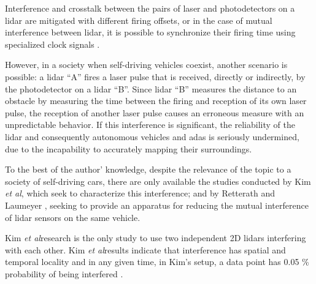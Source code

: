 \documentclass[extendedabs]{recpad2k}
\def\etal{\emph{et al}\bmvaOneDot}
\begin{document}
Interference and crosstalk between the pairs of laser and photodetectors on a \gls{lidar} are mitigated with different firing offsets, or in the case of mutual interference between \gls{lidar}, it is possible to synchronize their firing time using specialized clock signals \cite{vlp16}.

However, in a society when self-driving vehicles coexist, another scenario is possible: a \gls{lidar} ``A'' fires a laser pulse that is received, directly or indirectly, by the photodetector on a \gls{lidar} ``B''. Since \gls{lidar} ``B'' measures the distance to an obstacle by measuring the time between the firing and reception of its own laser pulse, the reception of another laser pulse causes an erroneous measure with an unpredictable behavior. If this interference is significant, the reliability of the \gls{lidar} and consequently autonomous vehicles and \gls{adas} is seriously undermined, due to the incapability to accurately mapping their surroundings.

To the best of the author' knowledge, despite the relevance of the topic to a society of self-driving cars, there are only available the studies conducted by Kim \etal \cite{Kim2017, Kim2015}, which seek to characterize this interference; and by Retterath and Laumeyer \cite{Al.2013}, seeking to provide an apparatus for reducing the mutual interference of \gls{lidar} sensors on the same vehicle.


Kim \etal research %
is the only study to use two independent 2D \gls{lidar}s interfering with each other. Kim \etal results indicate that interference has spatial and temporal locality \cite{Kim2015} and in any given time, in Kim's setup, a data point has 0.05 \% probability of being interfered \cite{Kim2015}.
\end{document}
